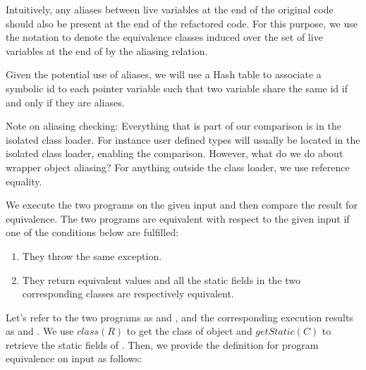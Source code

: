 \documentclass[runningheads,a4paper]{llncs}
\begin{document}
Intuitively, any aliases between live variables at the end of the original code should also
be present at the end of the refactored code. For this purpose, we use the notation
 to denote the equivalence classes induced over the
set of live variables at the end of  by the aliasing relation.







Given the potential use of aliases, we will use a Hash table to
associate a symbolic id to each pointer variable such that two
variable share the same id if and only if they are aliases.

Note on aliasing checking:
Everything that is part of our comparison is in the isolated class loader.
For instance user defined types will usually be located in the isolated
class loader, enabling the comparison.
However, what do we do about wrapper object aliasing?
For anything outside the class loader, we use reference equality.

We execute the two programs on the given input and then compare the
result for equivalence. The two programs are equivalent with respect to
the given input if one of the conditions below are fulfilled: 
\begin{enumerate}
\item They throw the same exception.
\item They return equivalent values and all the static fields in the two corresponding classes
  are respectively equivalent.
\end{enumerate}  

Let's refer to the two programs as  and , and the corresponding execution results
as  and . We use $class(R)$ to get the class of object  and
$getStatic(C)$ to retrieve the static fields of . Then, we provide the definition
for program equivalence on input  as follows:
\end{document}
